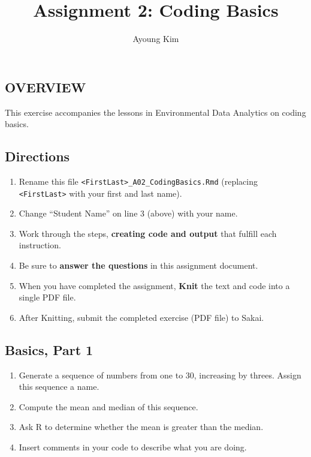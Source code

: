 \documentclass[
]{article}
\title{Assignment 2: Coding Basics}
\author{Ayoung Kim}
\date{}
\providecommand{\tightlist}{%
  \setlength{\itemsep}{0pt}\setlength{\parskip}{0pt}}
\begin{document}
\maketitle

\hypertarget{overview}{%
\subsection{OVERVIEW}\label{overview}}

This exercise accompanies the lessons in Environmental Data Analytics on
coding basics.

\hypertarget{directions}{%
\subsection{Directions}\label{directions}}

\begin{enumerate}
\def\labelenumi{\arabic{enumi}.}
\tightlist
\item
  Rename this file
  \texttt{\textless{}FirstLast\textgreater{}\_A02\_CodingBasics.Rmd}
  (replacing \texttt{\textless{}FirstLast\textgreater{}} with your first
  and last name).
\item
  Change ``Student Name'' on line 3 (above) with your name.
\item
  Work through the steps, \textbf{creating code and output} that fulfill
  each instruction.
\item
  Be sure to \textbf{answer the questions} in this assignment document.
\item
  When you have completed the assignment, \textbf{Knit} the text and
  code into a single PDF file.
\item
  After Knitting, submit the completed exercise (PDF file) to Sakai.
\end{enumerate}

\hypertarget{basics-part-1}{%
\subsection{Basics, Part 1}\label{basics-part-1}}

\begin{enumerate}
\def\labelenumi{\arabic{enumi}.}
\item
  Generate a sequence of numbers from one to 30, increasing by threes.
  Assign this sequence a name.
\item
  Compute the mean and median of this sequence.
\item
  Ask R to determine whether the mean is greater than the median.
\item
  Insert comments in your code to describe what you are doing.
\end{enumerate}
\end{document}
